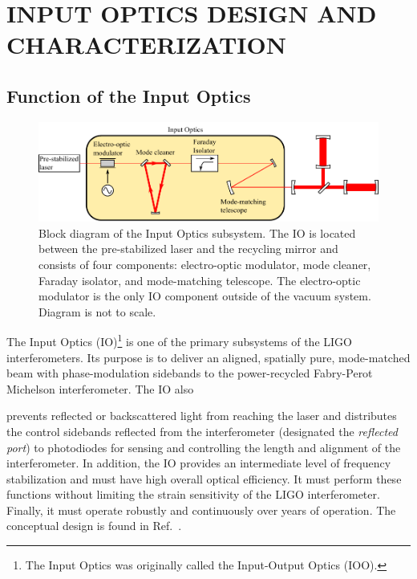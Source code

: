 \chapter{INPUT OPTICS DESIGN AND CHARACTERIZATION}

\section{Function of the Input Optics}
\label{sec:role}

\begin{figure}
\begin{centering}
\includegraphics{figures/InputOpticsBlock_thesis.pdf}
\caption[Block diagram of the Input Optics subsystem.]{Block diagram
  of the Input Optics subsystem. The IO is located between the
  pre-stabilized laser and the recycling mirror and consists of four
  components: electro-optic modulator, mode cleaner, Faraday isolator,
  and mode-matching telescope. The electro-optic modulator is the only
  IO component outside of the vacuum system. Diagram is not to scale.}
\label{fig:IOblock}
\end{centering}
\end{figure}

The Input Optics (IO)\footnote{The Input Optics was originally called
  the Input-Output Optics (IOO).} is one of the primary subsystems of the LIGO
interferometers. Its purpose is to deliver an aligned, spatially
pure, mode-matched beam with phase-modulation sidebands to the
power-recycled Fabry-Perot Michelson interferometer. The IO also

prevents reflected or backscattered light from reaching the laser and
distributes the control sidebands reflected from the interferometer
(designated the \emph{reflected port}) to photodiodes for sensing and
controlling the length and alignment of the interferometer. In
addition, the IO provides an intermediate level of frequency
stabilization and must have high overall optical efficiency. It must
perform these functions without limiting the strain sensitivity of the
LIGO interferometer.  Finally, it must operate robustly and
continuously over years of operation. The conceptual design is found
in Ref.~\citep{Camp1996InputOutput}.

